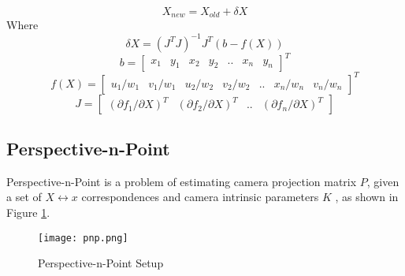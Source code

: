 \documentclass[11pt, a4paper, openany]{article}
\begin{document}
\begin{description}
\begin{equation}
X_{new} = X_{old} + \delta X
\end{equation}
Where
\begin{equation}
\delta X = (J^{T}J)^{-1}J^{T}(b-f(X))
\end{equation}
\begin{equation}
b = \begin{bmatrix} x_{1} & y_{1} & x_{2} & y_{2} & .. & x_{n} & y_{n}  \end{bmatrix}^{T}
\end{equation}
\begin{equation}
f(X) = \begin{bmatrix} u_{1}/w_{1} & v_{1}/w_{1} & u_{2}/w_{2} & v_{2}/w_{2} & .. & x_{n}/w_{n} & v_{n}/w_{n} \end{bmatrix}^{T}
\end{equation}
\begin{equation}
J = \begin{bmatrix} (\partial{f_{1}}/\partial{X})^{T} & (\partial{f_{2}}/\partial{X})^{T} & .. & (\partial{f_{n}}/\partial{X})^{T} \end{bmatrix}
\end{equation}
\end{description}

\subsection{Perspective-n-Point} \label{ssec:num1} Perspective-n-Point is a problem of estimating camera projection matrix $P$, given a set of $X \leftrightarrow x$ correspondences and camera intrinsic parameters $K$ \cite{pnpref}, as shown in Figure \ref{fig:pnp}.

\begin{figure}
  \texttt{[image: pnp.png]}
  \caption{Perspective-n-Point Setup}
  \label{fig:pnp}
\end{figure}
\end{document}
